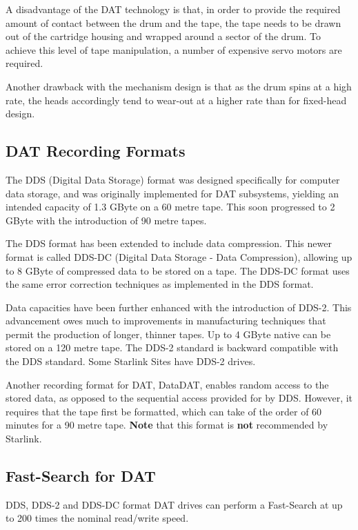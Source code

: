 \documentclass[11pt]{article}
\begin{document}
A disadvantage of the DAT technology is that, in order to provide the required
amount of contact between the drum and the tape, the tape needs to be drawn
out of the cartridge housing and wrapped around a sector of the drum. To
achieve this level of tape manipulation, a number of expensive servo motors
are required.

Another drawback with the mechanism design is that as the drum spins at a
high rate, the heads accordingly tend to wear-out at a higher rate than for
fixed-head design.

\subsection {DAT Recording Formats}

The DDS (Digital Data Storage) format was designed specifically for computer
data storage, and was originally implemented for DAT subsystems, yielding an
intended capacity of 1.3 GByte on a 60 metre tape. This soon progressed to
2 GByte with the introduction of 90 metre tapes.

The DDS format has been extended to include data compression. This newer
format is called DDS-DC (Digital Data Storage - Data Compression), allowing
up to 8 GByte of compressed data to be stored on a tape. The DDS-DC format
uses the same error correction techniques as implemented in the DDS format.

Data capacities have been further enhanced with the introduction of DDS-2.
This advancement owes much to improvements in manufacturing techniques that
permit the production of longer, thinner tapes. Up to 4 GByte native can be
stored on a 120 metre tape. The DDS-2 standard is backward compatible with
the DDS standard. Some Starlink Sites have DDS-2 drives.

Another recording format for DAT, DataDAT, enables random access to the
stored data, as opposed to the sequential access provided for by DDS.
However, it requires that the tape first be formatted, which can take of the
order of 60 minutes for a 90 metre tape. {\bf Note} that this format is
{\bf not} recommended by Starlink.

\subsection {Fast-Search for DAT}

DDS, DDS-2 and DDS-DC format DAT drives can perform a Fast-Search at up to
200 times the nominal read/write speed.
\end{document}
